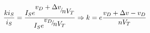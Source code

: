 \[\frac{{k{i_S}}}{{{i_S}}} = \frac{{{I_S}{e^{{\raise0.7ex\hbox{${{v_D} + \Delta v}$} \!\mathord{\left/
{\vphantom {{{v_D} + \Delta v} {n{V_T}}}}\right.\kern-\nulldelimiterspace}
\!\lower0.7ex\hbox{${n{V_T}}$}}}}}}{{{I_S}{e^{{\raise0.7ex\hbox{${{v_D}}$} \!\mathord{\left/
{\vphantom {{{v_D}} {n{V_T}}}}\right.\kern-\nulldelimiterspace}
\!\lower0.7ex\hbox{${n{V_T}}$}}}}}} \Rightarrow k = e\frac{{{v_D} + \Delta v - {v_D}}}{{n{V_T}}}\]
